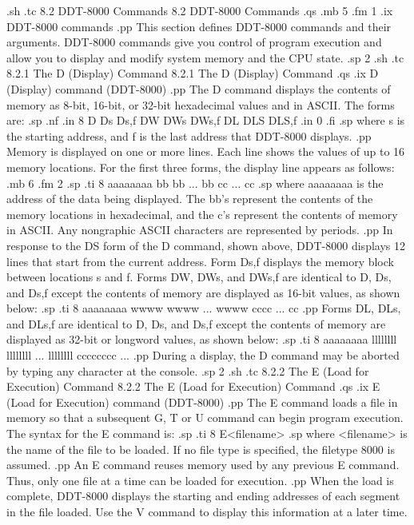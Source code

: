 .sh
.tc    8.2  DDT-8000 Commands
8.2  DDT-8000 Commands
.qs
.mb 5
.fm 1
.ix DDT-8000 commands
.pp
This section defines DDT-8000 commands and their arguments.  DDT-8000
commands give you control of program execution and allow you to display 
and modify system memory and the CPU state.
.sp 2
.sh
.tc         8.2.1  The D (Display) Command
8.2.1  The D (Display) Command
.qs
.ix D (Display) command (DDT-8000)
.pp 
The D command displays the contents of memory
as 8-bit, 16-bit, or 32-bit hexadecimal values and in ASCII.
The forms are:
.sp
.nf
.in 8
D
Ds
Ds,f
DW
DWs
DWs,f
DL
DLS
DLS,f
.in 0
.fi
.sp
where s is the starting address, and f is the last address that DDT-8000
displays.
.pp 
Memory is displayed on one or more lines.  Each line shows
the values of up to 16 memory locations.  For the first three forms, the
display line appears as follows:
.mb 6
.fm 2
.sp
.ti 8
aaaaaaaa bb bb ... bb cc ... cc
.sp
where aaaaaaaa is the address of the data being displayed.  The bb's 
represent the contents of the memory locations in hexadecimal, and the c's 
represent the contents of memory in ASCII.  Any nongraphic ASCII characters 
are represented by periods.
.pp 
In response to the DS form of the D command, shown above, DDT-8000 displays 12 
lines that start from the 
current address. 
Form Ds,f displays the memory block between locations s and f.  Forms DW, DWs,
and DWs,f are identical to D, Ds, and Ds,f except the contents of 
memory are displayed as 16-bit values, as shown below:
.sp
.ti 8
aaaaaaaa  wwww  wwww  ...  wwww  cccc  ...  cc
.pp 
Forms DL, DLs, and DLs,f are identical to D, Ds, and Ds,f except the 
contents of memory are displayed as 32-bit or longword values, as shown below:
.sp
.ti 8
aaaaaaaa llllllll llllllll ... llllllll cccccccc ...
.pp
During a display, the D command may be aborted by typing any character
at the console.
.sp 2
.sh
.tc         8.2.2  The E (Load for Execution) Command
8.2.2  The E (Load for Execution) Command
.qs
.ix E (Load for Execution) command (DDT-8000)
.pp 
The E command loads a file in memory so that a subsequent G, T or U command 
can begin program execution.  The syntax for the E command is:
.sp
.ti 8
E<filename>
.sp
where <filename> is the name of the file to be loaded.  If no file type is 
specified, the filetype 8000 is assumed.  
.pp 
An E command reuses memory used by any previous E command.  Thus, only one 
file at a time can be loaded for execution.
.pp 
When the load is complete, DDT-8000 displays the starting and
ending addresses of each segment in the file loaded.
Use the V command to display this information at
a later time.

